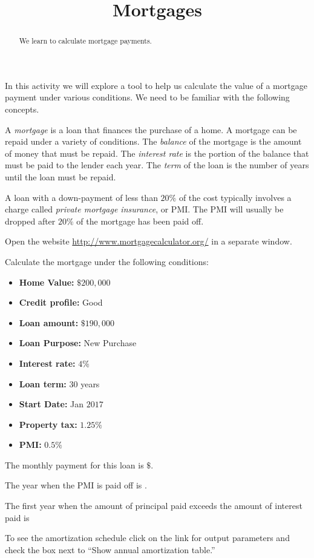 \documentclass{ximera}
\title{Mortgages}
\begin{document}
\begin{abstract}
We learn to calculate mortgage payments.
\end{abstract}
\maketitle

In this activity we will explore a tool to help us calculate the value of a mortgage payment under various conditions. We need to be familiar with the following concepts.  

A \emph{mortgage} is a loan that finances the purchase of a home. A mortgage can be repaid under a variety of conditions. The \emph{balance} of the mortgage is the amount of money that must be repaid. The \emph{interest rate} is the portion of the balance that must be paid to the lender each year. The \emph{term} of the loan is the number of years until the loan must be repaid.

A loan with a down-payment of less than $20\%$ of the cost typically involves a charge called \emph{private mortgage insurance}, or PMI. The PMI will usually be dropped after $20\%$ of the mortgage has been paid off.

Open the website \href{http://www.mortgagecalculator.org/}{http://www.mortgagecalculator.org/} in a separate window. 

\begin{question}
Calculate the mortgage under the following conditions:
\begin{itemize}
\item\textbf{Home Value:} $\$200,000$
\item\textbf{Credit profile:} Good
\item\textbf{Loan amount:} $\$190,000$
\item\textbf{Loan Purpose:} New Purchase
\item\textbf{Interest rate:} $4$\%
\item\textbf{Loan term:} $30$ years
\item\textbf{Start Date:} Jan $2017$
\item\textbf{Property tax:} $1.25\%$
\item\textbf{PMI:} $0.5\%$
\end{itemize}

The monthly payment for this loan is $\$$.

The year when the PMI is paid off is .

The first year when the amount of principal paid exceeds the amount of interest paid is 

\begin{hint}
To see the amortization schedule click on the link for output parameters and check the box next to ``Show annual amortization table.''
\end{hint}
\end{question}
\end{document}
